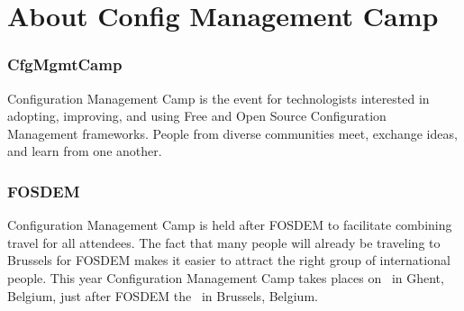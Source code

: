 



\makeatletter
\renewcommand{\maketitle}{
	\begin{titlepage}
	\end{titlepage}
}
\maketitle

\section{About Config Management Camp}

\begin{frame}
\frametitle{CfgMgmtCamp}
Configuration Management Camp is the event for technologists interested in adopting, improving, and using
Free and Open Source Configuration Management frameworks. People from diverse communities meet, exchange ideas, and learn from one another.
\end{frame}

\begin{frame}
\frametitle{FOSDEM}
Configuration Management Camp is held after FOSDEM to facilitate combining travel for all attendees.
The fact that many people will already be traveling to Brussels for FOSDEM makes it easier to attract the right group of international people.
This year Configuration Management Camp takes places on \confdates\ in Ghent, Belgium, just after FOSDEM the \fosdemdates\ in Brussels, Belgium.
\end{frame}

